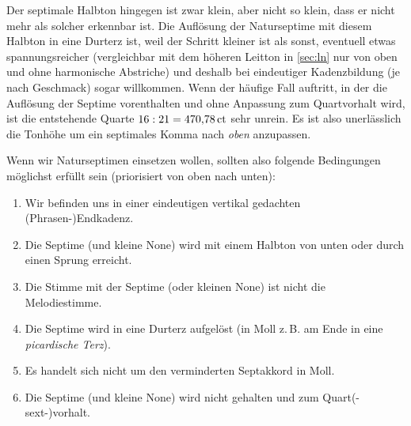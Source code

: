 Der septimale Halbton hingegen ist zwar klein, aber nicht so klein, dass er nicht mehr als solcher erkennbar ist. Die Auflösung der Naturseptime mit diesem Halbton in eine Durterz ist, weil der Schritt kleiner ist als sonst, eventuell etwas spannungsreicher (vergleichbar mit dem höheren Leitton in \cref{sec:ln} nur von oben und ohne harmonische Abstriche) und deshalb bei eindeutiger Kadenzbildung (je nach Geschmack) sogar willkommen. Wenn der häufige Fall auftritt, in der die Auflösung der Septime vorenthalten und ohne Anpassung zum Quartvorhalt wird, ist die entstehende Quarte $16:21 = 470{,}78\,\text{ct}$ sehr unrein. Es ist also unerlässlich die Tonhöhe um ein septimales Komma nach \emph{oben} anzupassen.

Wenn wir Naturseptimen einsetzen wollen, sollten also folgende Bedingungen möglichst erfüllt sein (priorisiert von oben nach unten):

\begin{enumerate}
  \item Wir befinden uns in einer eindeutigen vertikal gedachten (Phrasen-)Endkadenz.
  \item Die Septime (und kleine None) wird mit einem Halbton von unten oder durch einen Sprung erreicht.
  \item Die Stimme mit der Septime (oder kleinen None) ist nicht die Melodiestimme.
  \item Die Septime wird in eine Durterz aufgelöst (in Moll z.\,B. am Ende in eine \emph{picardische Terz}).
  \item Es handelt sich nicht um den verminderten Septakkord in Moll.
  \item Die Septime (und kleine None) wird nicht gehalten und zum Quart(-sext-)vorhalt.
\end{enumerate}

